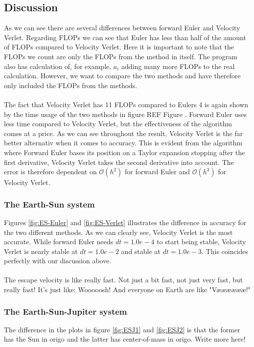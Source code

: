 \documentclass{article}
\newcommand{\husk}[1]{\color{red} #1 \color{black}}
\begin{document}
\subsection{Discussion}
As we can see there are several differences between forward Euler and Velocity Verlet. Regarding FLOPs we can see that Euler has less than half of the amount of FLOPs compared to Velocity Verlet. Here it is important to note that the FLOPs we count are only the FLOPs from the method in itself. The program also has calculation of, for example, $a_i$ adding many more FLOPs to the real calculation. However, we want to compare the two methods and have therefore only included the FLOPs from the methods. \\ \\ The fact that Velocity Verlet has 11 FLOPs compared to Eulers 4 is again shown by the time usage of the two methods in figure \husk{REF Figure}. Forward Euler uses less time compared to Velocity Verlet, but the effectiveness of the algorithm comes at a price. As we can see throughout the result, Velocity Verlet is the far better alternativ when it comes to accuracy. This is evident from the algorithm where Forward Euler bases its position on a Taylor expansion stopping after the first derivative, Velocity Verlet takes the second derivative into account. The error is therefore dependent on $\mathcal{O}(h^2)$ for forward Euler and $\mathcal{O}(h^3)$ for Velocity Verlet.
\subsubsection*{The Earth-Sun system}
Figures \ref{fig:ES-Euler} and \ref{fig:ES-Verlet} illustrates the difference in accuracy for the two different methods. As we can clearly see, Velocity Verlet is the most accurate. While forward Euler needs $dt = 1.0e-4$ to start being stable, Velocity Verlet is nearly stable at $dt = 1.0e-2$ and stable at $dt = 1.0e-3$. This coincides perfectly with our discussion above. \\ \\
The escape velocity is like really fast. Not just a bit fast, not just very fast, but really fast! It's just like: Wooooosh! And everyone on Earth are like "Vææææææ!"
\subsubsection*{The Earth-Sun-Jupiter system}
The difference in the plots in figure \ref{fig:ESJ1} and \ref{fig:ESJ2} is that the former has the Sun in origo and the latter has center-of-mass in origo. \husk{Write more here!}\\ \\
\end{document}
